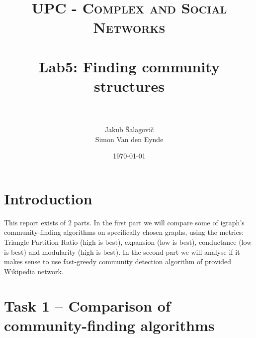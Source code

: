 \documentclass[paper=a4, fontsize=11pt]{scrartcl} %
\title{
\normalfont \normalsize
\textsc{UPC - Complex and Social Networks} \\ [25pt] %
\horrule{0.5pt} \\[0.4cm] %
\huge Lab5: Finding community structures \\ %
\horrule{2pt} \\[0.5cm] %
}
\author{Jakub Šalagovič\\Simon Van den Eynde} %
\date{\normalsize\today} %
\begin{document}
\maketitle %



\section{Introduction}
This report exists of $2$ parts. In the first part we will compare some of igraph's community-finding algorithms on specifically chosen graphs, using the metrics: Triangle Partition Ratio (high is best), expansion (low is best), conductance (low is best) and modularity (high is best). In the second part we will analyse if it makes sense to use fast-greedy community detection algorithm of provided Wikipedia network. 
\section{Task 1 -- Comparison of community-finding algorithms}
\end{document}
